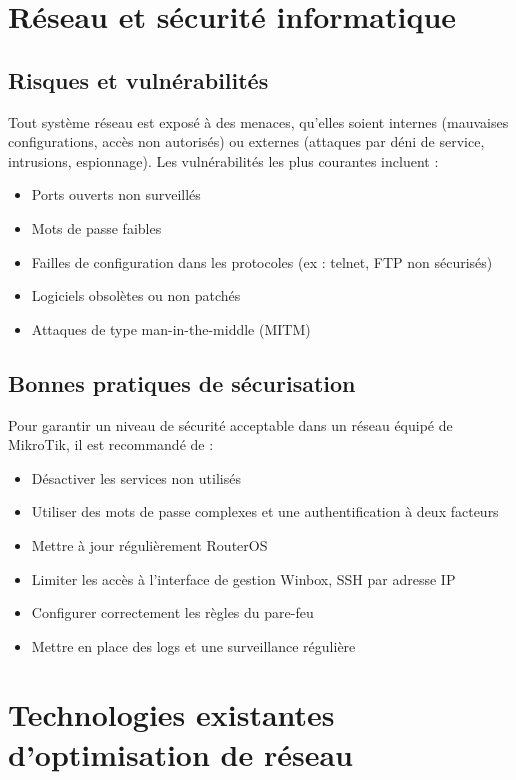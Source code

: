 \section{Réseau et sécurité informatique}

\subsection{Risques et vulnérabilités}
Tout système réseau est exposé à des menaces, qu'elles soient internes (mauvaises 
configurations, accès non autorisés) ou externes (attaques par déni de service, 
intrusions, espionnage). Les vulnérabilités les plus courantes incluent : 
\begin{itemize}
    \item Ports ouverts non surveillés
    \item Mots de passe faibles
    \item Failles de configuration dans les protocoles (ex : telnet, FTP non sécurisés)
    \item Logiciels obsolètes ou non patchés
    \item Attaques de type man-in-the-middle (\gls{MITM})
\end{itemize}

\subsection{Bonnes pratiques de sécurisation}
Pour garantir un niveau de sécurité acceptable dans un réseau équipé de MikroTik, il 
est recommandé de : 
\begin{itemize}
    \item Désactiver les services non utilisés
    \item Utiliser des mots de passe complexes et une authentification à deux facteurs
    \item Mettre à jour régulièrement RouterOS
    \item Limiter les accès à l’interface de gestion Winbox, \gls{SSH} par adresse \gls{IP}
    \item Configurer correctement les règles du pare-feu
    \item Mettre en place des logs et une surveillance régulière
\end{itemize}

\section{Technologies existantes d’optimisation de réseau}

